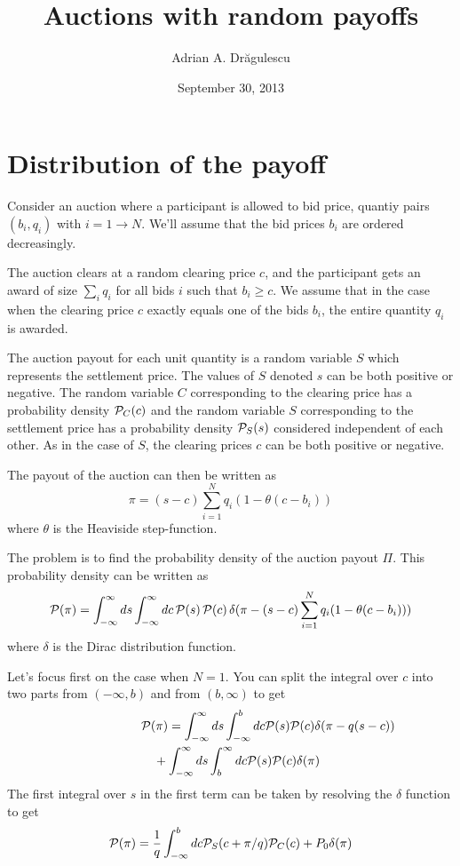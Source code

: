 \documentclass[12pt]{article}
\begin{document}
\title{Auctions with random payoffs}
\author{Adrian A. Dr\u{a}gulescu}
\date{September 30, 2013}
\maketitle



\section{Distribution of the payoff}
Consider an auction where a participant is allowed to bid price,
quantiy pairs $(b_i, q_i)$ with $i=1\to N$.  We'll assume that the bid
prices $b_i$ are ordered decreasingly. 

The auction clears at a random clearing price $c$, and the participant
gets an award of size $\sum_i q_i$ for all bids $i$ such that $b_i
\geq c$.  We assume that in the case when the clearing price $c$
exactly equals one of the bids $b_i$, the entire quantity $q_i$ is
awarded.

The auction payout for each unit quantity is a random variable $S$
which represents the settlement price.  The values of $S$ denoted $s$
can be both positive or negative.  The random variable $C$
corresponding to the clearing price has a probability density ${\cal
  P}_C(c)$ and the random variable $S$ corresponding to the settlement
price has a probability density ${\cal P}_S(s)$ considered independent
of each other.  As in the case of $S$, the clearing prices $c$ can be
both positive or negative. 

The payout of the auction can then be written as
\begin{equation}
  \pi = (s - c)\sum_{i=1}^N q_i (1 - \theta(c - b_i)) 
\end{equation}
where $\theta$ is the Heaviside step-function.  

The problem is to find the probability density of the auction payout
$\Pi$.  This probability density can be written as
\begin{equation}
  {\cal P}(\pi) = \int_{-\infty}^{\infty}ds \int_{-\infty}^{\infty}dc\,
    {\cal P}(s)\,{\cal P}(c)\, 
    \delta(\pi - (s - c)\sum_{i=1}^N q_i (1 - \theta(c-b_i))) 
\end{equation}
where $\delta$ is the Dirac distribution function. 

Let's focus first on the case when $N=1$.  You can split the integral
over $c$ into two parts from $(-\infty,b)$ and from $(b,\infty)$ to
get
\begin{eqnarray*}
  \lefteqn{{\cal P}(\pi) = \int_{-\infty}^{\infty}ds \int_{-\infty}^{b}dc
    {\cal P}(s) {\cal P}(c) \delta(\pi - q(s - c)) }\\ 
  && {} + \int_{-\infty}^{\infty}ds \int_{b}^{\infty}dc
    {\cal P}(s) {\cal P}(c) \delta(\pi)
\end{eqnarray*}
The first integral over $s$ in the first term can be taken by
resolving the $\delta$ function to get
\begin{equation}
  {\cal P}(\pi) = \frac{1}{q}\int_{-\infty}^{b}dc
    {\cal P}_S(c+\pi/q) {\cal P}_C(c) + P_0\delta(\pi) 
\end{equation}
\end{document}
